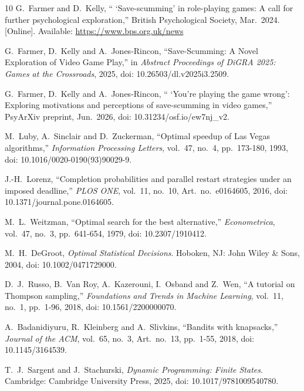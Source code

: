 \documentclass[11pt,a4paper]{article}
\begin{document}
{\small
\setlength{\itemsep}{0.28em}
\begin{thebibliography}{10}
G.~Farmer and D.~Kelly, `` `Save-scumming' in role-playing games: A call for further psychological exploration,'' British Psychological Society, Mar.\ 2024. [Online]. Available: \url{https://www.bps.org.uk/news}

G.~Farmer, D.~Kelly and A.~Jones-Rincon, ``Save-Scumming: A Novel Exploration of Video Game Play,'' in \emph{Abstract Proceedings of DiGRA 2025: Games at the Crossroads}, 2025, doi: 10.26503/dl.v2025i3.2509.

G.~Farmer, D.~Kelly and A.~Jones-Rincon, `` `You're playing the game wrong': Exploring motivations and perceptions of save-scumming in video games,'' PsyArXiv preprint, Jun.\ 2026, doi: 10.31234/osf.io/ew7nj\_v2.

M.~Luby, A.~Sinclair and D.~Zuckerman, ``Optimal speedup of Las Vegas algorithms,'' \emph{Information Processing Letters}, vol.~47, no.~4, pp.~173-180, 1993, doi: 10.1016/0020-0190(93)90029-9.

J.-H.~Lorenz, ``Completion probabilities and parallel restart strategies under an imposed deadline,'' \emph{PLOS ONE}, vol.~11, no.~10, Art.~no.~e0164605, 2016, doi: 10.1371/journal.pone.0164605.

M.~L.~Weitzman, ``Optimal search for the best alternative,'' \emph{Econometrica}, vol.~47, no.~3, pp.~641-654, 1979, doi: 10.2307/1910412.

M.~H.~DeGroot, \emph{Optimal Statistical Decisions}. Hoboken, NJ: John Wiley \& Sons, 2004, doi: 10.1002/0471729000.

D.~J.~Russo, B.~Van Roy, A.~Kazerouni, I.~Osband and Z.~Wen, ``A tutorial on Thompson sampling,'' \emph{Foundations and Trends in Machine Learning}, vol.~11, no.~1, pp.~1-96, 2018, doi: 10.1561/2200000070.

A.~Badanidiyuru, R.~Kleinberg and A.~Slivkins, ``Bandits with knapsacks,'' \emph{Journal of the ACM}, vol.~65, no.~3, Art.~no.~13, pp.~1-55, 2018, doi: 10.1145/3164539.

T.~J.~Sargent and J.~Stachurski, \emph{Dynamic Programming: Finite States}. Cambridge: Cambridge University Press, 2025, doi: 10.1017/9781009540780.
\end{thebibliography}
}
\end{document}
